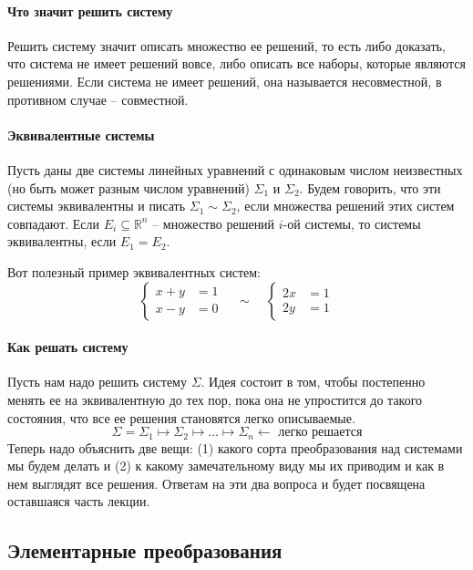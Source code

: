 \paragraph{Что значит решить систему}
Решить систему значит описать множество ее решений, то есть либо доказать, что система не имеет решений вовсе, либо описать все наборы, которые являются решениями.
Если система не имеет решений, она называется несовместной, в противном случае -- совместной.

\paragraph{Эквивалентные системы}
Пусть даны две системы линейных уравнений с одинаковым числом неизвестных (но быть может разным числом уравнений) $\Sigma_1$ и $\Sigma_2$.
Будем говорить, что эти системы эквивалентны и писать $\Sigma_1 \sim \Sigma_2$, если множества решений этих систем совпадают.
Если $E_i\subseteq \mathbb R^n$ -- множество решений $i$-ой системы, то системы эквивалентны, если $E_1 = E_2$.

Вот полезный пример эквивалентных систем:
\[
\left\{
\begin{aligned}
x + y &= 1\\
x - y &= 0
\end{aligned}
\right.\quad\sim\quad
\left\{
\begin{aligned}
2x &= 1\\
2y &= 1
\end{aligned}
\right.
\]

\paragraph{Как решать систему}
Пусть нам надо решить систему $\Sigma$.
Идея состоит в том, чтобы постепенно менять ее на эквивалентную до тех пор, пока она не упростится до такого состояния, что все ее решения становятся легко описываемые.
\[
\Sigma = \Sigma_1 \mapsto \Sigma_2 \mapsto \ldots \mapsto \Sigma_n \leftarrow\text{ легко решается}
\]
Теперь надо объяснить две вещи: (1) какого сорта преобразования над системами мы будем делать и (2) к какому замечательному виду мы их приводим и как в нем выглядят все решения.
Ответам на эти два вопроса и будет посвящена оставшаяся часть лекции.

\subsection{Элементарные преобразования} 


